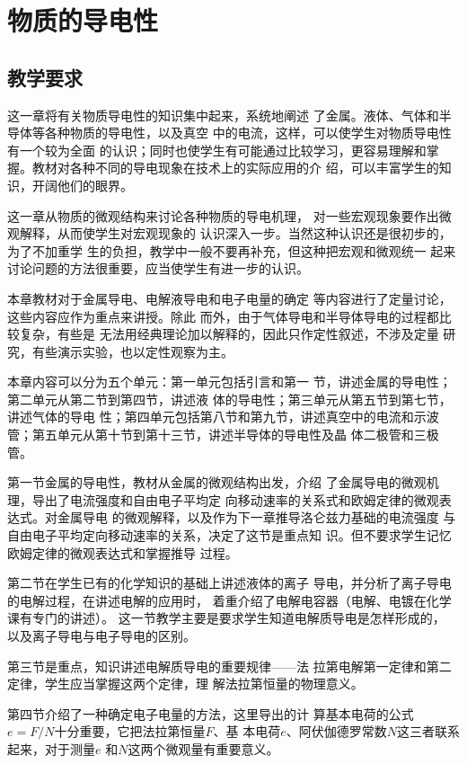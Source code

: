 \chapter{物质的导电性}
\section{教学要求}
这一章将有关物质导电性的知识集中起来，系统地阐述
了金属。液体、气体和半导体等各种物质的导电性，以及真空
中的电流，这样，可以使学生对物质导电性有一个较为全面
的认识；同时也使学生有可能通过比较学习，更容易理解和掌
握。教材对各种不同的导电现象在技术上的实际应用的介
绍，可以丰富学生的知识，开阔他们的眼界。

这一章从物质的微观结构来讨论各种物质的导电机理，
对一些宏观现象要作出微观解释，从而使学生对宏观现象的
认识深入一步。当然这种认识还是很初步的，为了不加重学
生的负担，教学中一般不要再补充，但这种把宏观和微观统一
起来讨论问题的方法很重要，应当使学生有进一步的认识。

本章教材对于金属导电、电解液导电和电子电量的确定
等内容进行了定量讨论，这些内容应作为重点来讲授。除此
而外，由于气体导电和半导体导电的过程都比较复杂，有些是
无法用经典理论加以解释的，因此只作定性叙述，不涉及定量
研究，有些演示实验，也以定性观察为主。

本章内容可以分为五个单元：第一单元包括引言和第一
节，讲述金属的导电性；第二单元从第二节到第四节，讲述液
体的导电性；第三单元从第五节到第七节，讲述气体的导电
性；第四单元包括第八节和第九节，讲述真空中的电流和示波
管；第五单元从第十节到第十三节，讲述半导体的导电性及晶
体二极管和三极管。

第一节金属的导电性，教材从金属的微观结构出发，介绍
了金属导电的微观机理，导出了电流强度和自由电子平均定
向移动速率的关系式和欧姆定律的微观表达式。对金属导电
的微观解释，以及作为下一章推导洛仑兹力基础的电流强度
与自由电子平均定向移动速率的关系，决定了这节是重点知
识。但不要求学生记忆欧姆定律的微观表达式和掌握推导
过程。

第二节在学生已有的化学知识的基础上讲述液体的离子
导电，并分析了离子导电的电解过程，在讲述电解的应用时，
着重介绍了电解电容器（电解、电镀在化学课有专门的讲述）。
这一节教学主要是要求学生知道电解质导电是怎样形成的，
以及离子导电与电子导电的区别。

第三节是重点，知识讲述电解质导电的重要规律——法
拉第电解第一定律和第二定律，学生应当掌握这两个定律，理
解法拉第恒量的物理意义。

第四节介绍了一种确定电子电量的方法，这里导出的计
算基本电荷的公式$e=F/N$十分重要，它把法拉第恒量$F$、基
本电荷$e$、阿伏伽德罗常数$N$这三者联系起来，对于测量$e$
和$N$这两个微观量有重要意义。

